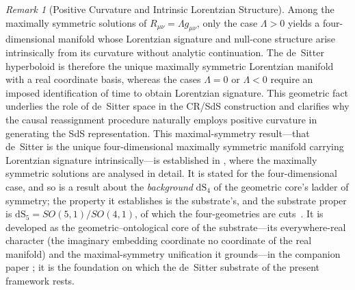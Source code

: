 \documentclass[11pt,a4paper]{article}
\theoremstyle{plain}
\theoremstyle{definition}
\theoremstyle{remark}
\newtheorem{remark}{Remark}
\begin{document}
\begin{remark}[Positive Curvature and Intrinsic Lorentzian Structure]
Among the maximally symmetric solutions of $R_{\mu\nu}=\Lambda g_{\mu\nu}$, only the case $\Lambda>0$ yields a four-dimensional manifold whose Lorentzian signature and null-cone structure arise intrinsically from its curvature without analytic continuation. The de~Sitter hyperboloid is therefore the unique maximally symmetric Lorentzian manifold with a real coordinate basis, whereas the cases $\Lambda=0$ or $\Lambda<0$ require an imposed identification of time to obtain Lorentzian signature. This geometric fact underlies the role of de~Sitter space in the CR/SdS construction and clarifies why the causal reassignment procedure naturally employs positive curvature in generating the SdS representation. This maximal-symmetry result---that de~Sitter is the unique four-dimensional maximally symmetric manifold carrying Lorentzian signature intrinsically---is established in \cite{JanzenThesis}, where the maximally symmetric solutions are analysed in detail. It is stated for the four-dimensional case, and so is a result about the \emph{background} $\mathrm{dS}_4$ of the geometric core's ladder of symmetry; the property it establishes is the substrate's, and the substrate proper is $\mathrm{dS}_5=SO(5,1)/SO(4,1)$, of which the four-geometries are cuts~\cite{JanzenGeometricCore,JanzenAlgebroid}. It is developed as the geometric--ontological core of the substrate---its everywhere-real character (the imaginary embedding coordinate no coordinate of the real manifold) and the maximal-symmetry unification it grounds---in the companion paper \cite{JanzenGeometricCore}; it is the foundation on which the de~Sitter substrate of the present framework rests.


\end{remark}
\end{document}
